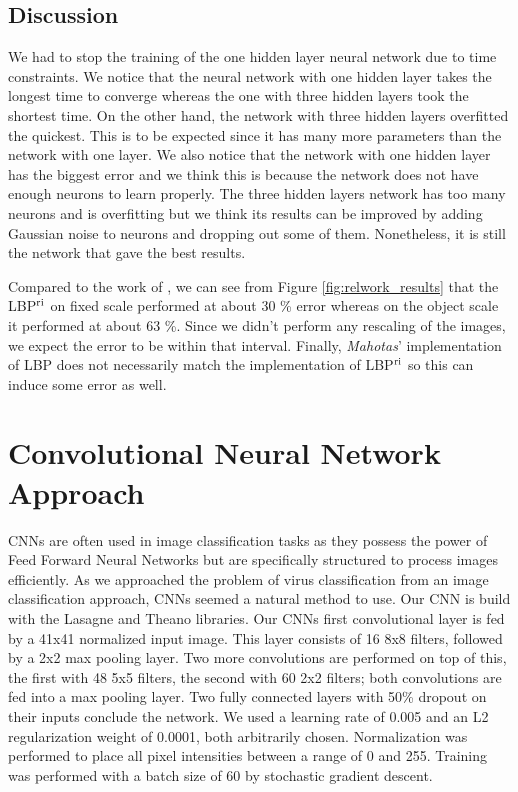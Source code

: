\begin{multicols}{2}
\subsection{Discussion}
We had to stop the training of the one hidden layer neural network due to time constraints. We notice that the neural network with one hidden layer takes the longest time to converge whereas the one with three hidden layers took the shortest time. On the other hand, the network with three hidden layers overfitted the quickest. This is to be expected since it has many more parameters than the network with one layer. We also notice that the network with one hidden layer has the biggest error and we think this is because the network does not have enough neurons to learn properly. The three hidden layers network has too many neurons and is overfitting but we think its results can be improved by adding Gaussian noise to neurons and dropping out some of them. Nonetheless, it is still the network that gave the best results. 
\par Compared to the work of \citet{kylberg2011virus}, we can see from Figure \ref{fig:relwork_results} that the LBP$^{\textnormal{ri}}$ on fixed scale performed at about 30 \% error whereas on the object scale it performed at about 63 \%. Since we didn't perform any rescaling of the images, we expect the error to be within that interval. Finally, \emph{Mahotas}' implementation of LBP does not necessarily match the implementation of LBP$^{\textnormal{ri}}$ so this can induce some error as well. 
\end{multicols}


\section{Convolutional Neural Network Approach}
CNNs are often used in image classification tasks as they possess the power of Feed Forward Neural Networks but are specifically structured to process images efficiently. As we approached the problem of virus classification from an image classification approach, CNNs seemed a natural method to use.
Our CNN is build with the Lasagne and Theano \cite{Bastien-Theano-2012, bergstra+al:2010-scipy} libraries. Our CNNs first convolutional layer is fed by a 41x41 normalized input image. This layer consists of 16 8x8 filters, followed by a 2x2 max pooling layer. Two more convolutions are performed on top of this, the first with 48 5x5 filters, the second with 60 2x2 filters; both convolutions are fed into a max pooling layer. Two fully connected layers with 50\% dropout on their inputs conclude the network. We used a learning rate of 0.005 and an L2 regularization weight of 0.0001, both arbitrarily chosen. Normalization was performed to place all pixel intensities between a range of 0 and 255. Training was performed with a batch size of 60 by stochastic gradient descent.

